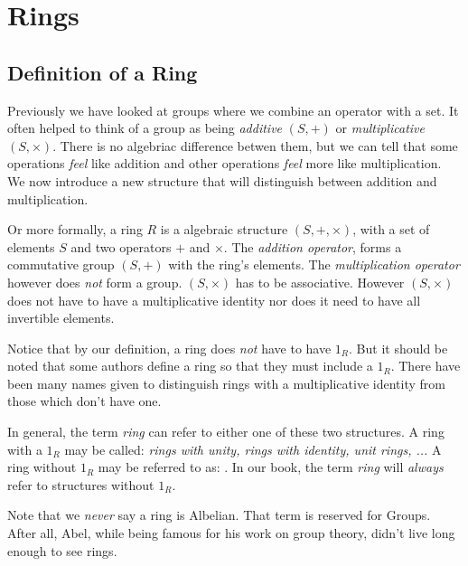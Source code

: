 
\chapter{Rings}




\section{Definition of a Ring}

Previously we have looked at groups where we combine an operator with a set. 
It often helped to think of a group as being \textit{additive} $(S, +)$ 
or \textit{multiplicative} $(S, \times)$. There is no algebriac difference betwen them, but we can 
tell that some operations \textit{feel} like addition and other operations \textit{feel} more 
like multiplication. We now introduce a new structure that will distinguish between addition 
and multiplication.


Or more formally, a ring $R$ is a algebraic structure $(S, +, \times)$,  
with a set of elements $S$ and two operators $+$ and $\times$. The \textit{addition operator}, 
forms a commutative group $(S,+)$ with the ring's elements. The \textit{multiplication operator} 
however does \textit{not} form a group. $(S,\times)$ has to be associative. However $(S,\times)$ does not 
have to have a multiplicative identity nor does it need to have all invertible elements. 


Notice that by our definition, a ring does \textit{not} have to have $1_R$. 
But it should be noted that some authors define a ring so that they must include a $1_R$.
There have been many names given to distinguish rings with a multiplicative identity from those 
which don't have one. 

In general, the term \textit{ring} can refer to either one of these two structures. 
A ring with a $1_R$ may be called: \textit{rings with unity, rings with identity, unit rings, ...}
A ring without $1_R$ may be referred to as: .
In our book, the term \textit{ring} will \textit{always} refer to structures without $1_R$. 



Note that we \textit{never} say a ring is Albelian. That term is reserved for Groups. 
After all, Abel, while being famous for his work on group theory, didn't live long 
enough to see rings. 

